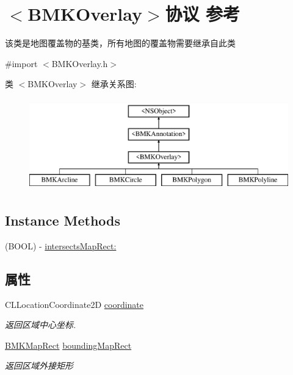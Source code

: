 \hypertarget{protocol_b_m_k_overlay-p}{\section{$<$B\+M\+K\+Overlay$>$协议 参考}
\label{protocol_b_m_k_overlay-p}
}


该类是地图覆盖物的基类，所有地图的覆盖物需要继承自此类  




{\ttfamily \#import $<$B\+M\+K\+Overlay.\+h$>$}

类 $<$B\+M\+K\+Overlay$>$ 继承关系图\+:\begin{figure}[H]
\begin{center}
\leavevmode
\includegraphics[height=4.000000cm]{protocol_b_m_k_overlay-p}
\end{center}
\end{figure}
\subsection*{Instance Methods}
\begin{DoxyCompactItemize}
\item 
(B\+O\+O\+L) -\/ \hyperlink{protocol_b_m_k_overlay-p_ad89c522da656c2a977b87bdc1cc4bf21}{intersects\+Map\+Rect\+:}
\end{DoxyCompactItemize}
\subsection*{属性}
\begin{DoxyCompactItemize}
\item 
\hypertarget{protocol_b_m_k_overlay-p_a7a10d9dde65c9611e3b5279179a9d480}{C\+L\+Location\+Coordinate2\+D \hyperlink{protocol_b_m_k_overlay-p_a7a10d9dde65c9611e3b5279179a9d480}{coordinate}}\label{protocol_b_m_k_overlay-p_a7a10d9dde65c9611e3b5279179a9d480}

\begin{DoxyCompactList}\small\item\em 返回区域中心坐标. \end{DoxyCompactList}\item 
\hypertarget{protocol_b_m_k_overlay-p_a77465daa9e52be51cc5aa15591ab74f0}{\hyperlink{struct_b_m_k_map_rect}{B\+M\+K\+Map\+Rect} \hyperlink{protocol_b_m_k_overlay-p_a77465daa9e52be51cc5aa15591ab74f0}{bounding\+Map\+Rect}}\label{protocol_b_m_k_overlay-p_a77465daa9e52be51cc5aa15591ab74f0}

\begin{DoxyCompactList}\small\item\em 返回区域外接矩形 \end{DoxyCompactList}\end{DoxyCompactItemize}



